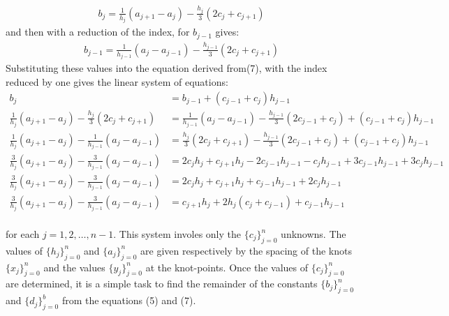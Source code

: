 \documentclass{article}
\theoremstyle{definition}
\begin{document}
\begin{equation}
    \begin{split}
        b_j = \frac{1}{h_j}(a_{j+1} - a_j) - \frac{h_j}{3}(2c_j + c_{j+1})
    \end{split}
\end{equation}
and then with a reduction of the index, for $b_{j-1}$ gives:
\begin{align}
    b_{j-1} = \frac{1}{h_{j-1}}(a_j - a_{j-1}) - \frac{h_{j-1}}{3}(2c_j + c_{j+1})
\end{align}
Substituting these values into the equation derived from(7), with the index reduced by one gives the linear system of equations:
\begin{equation}
    \begin{split}
    b_j &= b_{j-1} + (c_{j-1} + c_j)h_{j-1}\\
    \frac{1}{h_j}(a_{j+1} - a_j) - \frac{h_j}{3}(2c_j + c_{j+1}) &= \frac{1}{h_{j-1}}(a_{j} - a_{j-1}) - \frac{h_{j-1}}{3}(2c_{j-1} + c_{j}) + (c_{j-1} + c_j)h_{j-1}\\
    \frac{1}{h_j}(a_{j+1} - a_j) - \frac{1}{h_{j-1}}(a_{j} - a_{j-1}) &= \frac{h_j}{3}(2c_j + c_{j+1})- \frac{h_{j-1}}{3}(2c_{j-1} + c_{j}) + (c_{j-1} + c_j)h_{j-1}\\
    \frac{3}{h_j}(a_{j+1} - a_j) - \frac{3}{h_{j-1}}(a_{j} - a_{j-1}) &= 2c_jh_j + c_{j+1}h_j - 2c_{j-1}h_{j-1} - c_j h_{j-1} + 3c_{j-1}h_{j-1} + 3c_j h_{j-1}\\
    \frac{3}{h_j}(a_{j+1} - a_j) - \frac{3}{h_{j-1}}(a_{j} - a_{j-1}) &= 2c_jh_j + c_{j+1}h_j + c_{j-1}h_{j-1} + 2c_j h_{j-1}\\
    \frac{3}{h_j}(a_{j+1} - a_j) - \frac{3}{h_{j-1}}(a_{j} - a_{j-1}) &= c_{j+1}h_j + 2h_j(c_j + c_{j-1}) + c_{j-1}h_{j-1}\\
    \end{split}
\end{equation}

for each $j=1,2,\ldots,n-1$. This system involes only the $\{c_j\}_{j=0}^n$ unknowns. The values of $\{h_j\}_{j=0}^n$ and $\{a_j\}_{j=0}^n$ are given respectively by the spacing of the knots $\{x_j\}_{j=0}^n$ and the values $\{y_j\}_{j=0}^n$ at the knot-points. Once the values of $\{c_j\}_{j=0}^n$ are determined, it is a simple task to find the remainder of the constants $\{b_j\}_{j=0}^n$ and $\{d_j\}_{j=0}^b$ from the equations (5) and (7).
\end{document}
